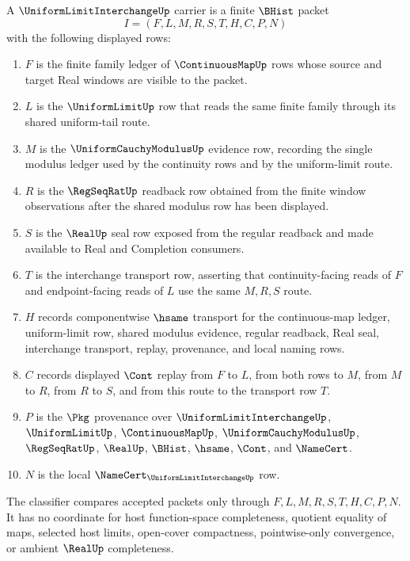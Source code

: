 \begin{definition}
\label{def:uniform-limit-interchange-carrier}
A $\UniformLimitInterchangeUp$ carrier is a finite $\BHist$ packet
$$
I=(F,L,M,R,S,T,H,C,P,N)
$$
with the following displayed rows:
\begin{enumerate}
\item $F$ is the finite family ledger of $\ContinuousMapUp$ rows whose source and target Real windows are visible to the packet.
\item $L$ is the $\UniformLimitUp$ row that reads the same finite family through its shared uniform-tail route.
\item $M$ is the $\UniformCauchyModulusUp$ evidence row, recording the single modulus ledger used by the continuity rows and by the uniform-limit route.
\item $R$ is the $\RegSeqRatUp$ readback row obtained from the finite window observations after the shared modulus row has been displayed.
\item $S$ is the $\RealUp$ seal row exposed from the regular readback and made available to Real and Completion consumers.
\item $T$ is the interchange transport row, asserting that continuity-facing reads of $F$ and endpoint-facing reads of $L$ use the same $M,R,S$ route.
\item $H$ records componentwise $\hsame$ transport for the continuous-map ledger, uniform-limit row, shared modulus evidence, regular readback, Real seal, interchange transport, replay, provenance, and local naming rows.
\item $C$ records displayed $\Cont$ replay from $F$ to $L$, from both rows to $M$, from $M$ to $R$, from $R$ to $S$, and from this route to the transport row $T$.
\item $P$ is the $\Pkg$ provenance over $\UniformLimitInterchangeUp$, $\UniformLimitUp$, $\ContinuousMapUp$, $\UniformCauchyModulusUp$, $\RegSeqRatUp$, $\RealUp$, $\BHist$, $\hsame$, $\Cont$, and $\NameCert$.
\item $N$ is the local $\NameCert_{\UniformLimitInterchangeUp}$ row.
\end{enumerate}
The classifier compares accepted packets only through $F,L,M,R,S,T,H,C,P,N$. It has no coordinate for host function-space completeness, quotient equality of maps, selected host limits, open-cover compactness, pointwise-only convergence, or ambient $\RealUp$ completeness.
\end{definition}

